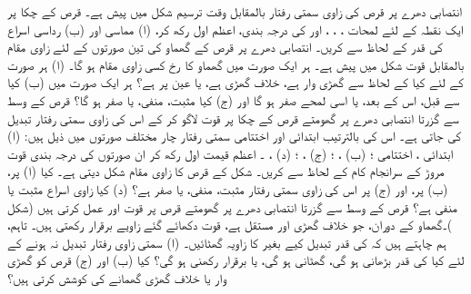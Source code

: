 \setcounter{questioncounter}{0}
انتصابی  دھرے  پر قرص  کی زاوی سمتی رفتار بالمقابل وقت  ترسیم شکل  میں پیش ہے۔ قرص کے چکا پر ایک   نقطہ  کے لئے  لمحات  ، ، ، اور  کی درجہ بندی، اعظم اول رکھ کر، (ا) مماسی اور (ب) رداسی اسراع کی قدر کے لحاظ سے کریں۔
انتصابی  دھرے  پر  قرص  کے گھماو کی تین صورتوں کے لئے زاوی مقام  بالمقابل قوت  شکل  میں پیش ہے۔ ہر ایک صورت میں گھماو کا رخ کسی زاوی مقام   ہو گا۔ (ا) ہر صورت کے لئے کیا    کے لحاظ سے     گھڑی وار ہے، خلاف گھڑی ہے، یا عین  پر ہے؟  ہر ایک صورت میں (ب) کیا     سے قبل، اس کے بعد، یا اسی لمحے  صفر ہو گا اور (ج) کیا   مثبت، منفی، یا صفر ہو گا؟
 قرص کے وسط سے گزرتا  انتصابی  دھرے  پر گھومتے  قرص کے چکا  پر قوت لاگو کر کے اس کی زاوی سمتی رفتار  تبدیل کی جاتی ہے۔ اس کی بالترتیب  ابتدائی اور اختتامی سمتی رفتار چار مختلف صورتوں میں ذیل ہیں:
 (ا) ابتدائی ، اختتامی ؛ 
 (ب)  ، ؛ 
 (ج)   ، ؛ 
 (د)   ، ۔
 اعظم قیمت اول رکھ کر ان صورتوں کی درجہ بندی  قوت مروڑ کے سرانجام کام کے لحاظ سے کریں۔
شکل  کے قرص کا زاوی مقام  شکل   دیتی ہے۔ کیا  (ا)  پر، (ب)     پر، اور (ج)   پر اس کی زاوی سمتی رفتار مثبت، منفی، یا صفر ہے؟ (د) کیا زاوی اسراع مثبت یا منفی ہے؟
 قرص کے وسط سے گزرتا انتصابی  دھرے  پر گھومتے قرص  پر قوت  اور  عمل کرتی ہیں (شکل )۔گھماو کے دوران، جو خلاف گھڑی  اور مستقل ہے،  قوت دکھائے گئے زاویے  برقرار رکھتی ہیں۔ تاہم، ہم چاہتے ہیں کہ  کی قدر تبدیل کیے بغیر  کا زاویہ   گھٹائیں۔ (ا)  سمتی زاوی رفتار تبدیل نہ ہونے کے لئے کیا   کی قدر بڑھانی ہو گی، گھٹانی ہو گی، یا  برقرار رکھنی ہو گی؟ کیا (ب)  اور (ج)  قرص کو گھڑی وار یا خلاف گھڑی گھمانے کی کوشش کرتی ہیں؟
